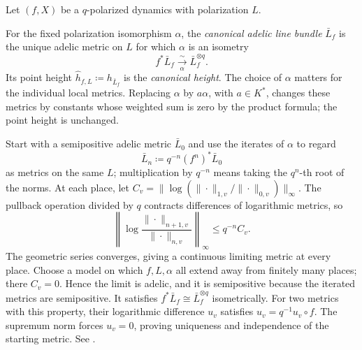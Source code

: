 \begin{definition}[label=\labelNFM{def:canonical-height}, status=draft, tag=0000000]
	Let $(f,X)$ be a $q$-polarized dynamics with polarization $L$.
	\begin{latexmathchange}
	For the fixed polarization isomorphism $\alpha$, the \emph{canonical adelic line bundle} $\bar L_f$ is the unique adelic metric on $L$ for which $\alpha$ is an isometry
	\[ f^*\bar L_f \xrightarrow[\alpha]{ \sim } \bar L_f^{\otimes q}. \]
	Its point height $\widehat h_{f,L} \coloneqq h_{\bar L_f}$ is the \emph{canonical height}.
	The choice of $\alpha$ matters for the individual local metrics.
	Replacing $\alpha$ by $a\alpha$, with $a \in K^*$, changes these metrics by constants whose weighted sum is zero by the product formula; the point height is unchanged.
	\end{latexmathchange}
\end{definition}

\begin{construction}[label=\labelNFM{constr:canonical-metric-by-iteration}, status=draft, tag=0000000]
	\leavevmode\par
	\begin{latexmathchange}
	Start with a semipositive adelic metric $\bar L_0$ and use the iterates of $\alpha$ to regard
	\[ \bar L_n \coloneqq q^{-n}(f^n)^*\bar L_0 \]
	as metrics on the same $L$; multiplication by $q^{-n}$ means taking the $q^n$-th root of the norms.
	At each place, let $C_v = \|\log(\|\cdot\|_{1,v}/\|\cdot\|_{0,v})\|_\infty$.
	The pullback operation divided by $q$ contracts differences of logarithmic metrics, so
	\[ \left\|\log\frac{\|\cdot\|_{n+1,v}}{\|\cdot\|_{n,v}}\right\|_\infty \leq q^{-n}C_v. \]
	The geometric series converges, giving a continuous limiting metric at every place.
	Choose a model on which $f,L,\alpha$ all extend away from finitely many places; there $C_v = 0$.
	Hence the limit is adelic, and it is semipositive because the iterated metrics are semipositive.
	It satisfies $f^*\bar L_f \cong \bar L_f^{\otimes q}$ isometrically.
	For two metrics with this property, their logarithmic difference $u_v$ satisfies $u_v = q^{-1}u_v\circ f$.
	The supremum norm forces $u_v = 0$, proving uniqueness and independence of the starting metric.
	See \cite[Theorem~6.1.1 and Appendix~A.5.2]{Yuan-Zhang-2026-AdelicLineBundles}.
	\end{latexmathchange}
\end{construction}

